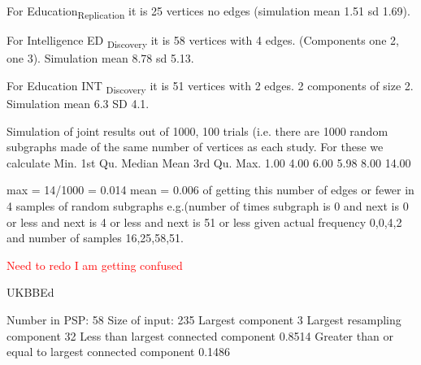 For Education\textsubscript{Replication} it is 25 vertices no edges (simulation mean 1.51 sd 1.69). 

For Intelligence ED  \textsubscript{Discovery} it is 58 vertices with 4 edges. (Components one 2, one 3).  Simulation mean 8.78 sd 5.13.

For Education INT \textsubscript{Discovery} it is 51 vertices with 2 edges. 2 components of size 2.  Simulation mean 6.3 SD 4.1.

Simulation of joint results out of 1000, 100 trials (i.e. there are 1000 random subgraphs made of the same number of vertices as each study. For these we calculate
Min. 1st Qu.  Median    Mean 3rd Qu.    Max. 
   1.00    4.00    6.00    5.98    8.00   14.00 
   
   max = 14/1000 = 0.014
   mean = 0.006 of getting this number of edges or fewer in 4 samples of random subgraphs e.g.(number of times subgraph is 0 and next is 0 or less and next is 4 or less and next is 51 or less given actual frequency 0,0,4,2 and number of samples 16,25,58,51.
   
 \textcolor{red}{Need to redo I am getting confused}

UKBBEd

Number in PSP: 58 
Size of input: 235 
Largest component 3
Largest resampling component 32
Less than largest connected component 0.8514 
Greater than or equal to largest connected component 0.1486



